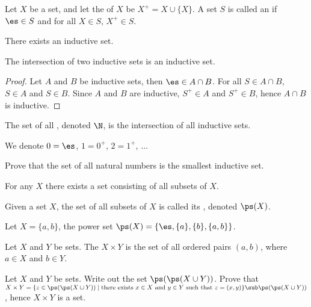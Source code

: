 \documentclass[10pt]{article}
\begin{document}
\begin{definition}
    Let $X$ be a set, and let the  of $X$ be ${X}^{+}=X\cup\{X\}$. A set $S$ is called an  if $\es\in S$ and for all $X\in S$, ${X}^{+}\in S$.
\end{definition}
\begin{Axiom of infinity}
    There exists an inductive set.
\end{Axiom of infinity}
\begin{proposition}
    The intersection of two inductive sets is an inductive set.
\end{proposition}
\begin{proof}
    Let $A$ and $B$ be inductive sets, then $\es\in A\cap B$. For all $S\in A\cap B$, $S\in A$ and $S\in B$. Since $A$ and $B$ are inductive, ${S}^{+}\in A$ and ${S}^{+}\in B$, hence $A\cap B$ is inductive.
\end{proof}
\par
\begin{definition}
    The set of all , denoted $\N$, is the intersection of all inductive sets. 
\end{definition}
\par
We denote $0=\es$, $1={0}^{+}$, $2={1}^{+}$, $\dots$
\begin{problem}
    Prove that the set of all natural numbers is the smallest inductive set.
\end{problem}
\begin{Axiom of power set}
    For any $X$ there exists a set consisting of all subsets of $X$.
\end{Axiom of power set}
\begin{definition}
    Given a set $X$, the set of all subsets of $X$ is called its , denoted $\ps(X)$.
\end{definition}
\begin{example}
    Let $X=\{a,b\}$, the power set $\ps(X)=\{\es,\{a\},\{b\},\{a,b\}\}$.
\end{example}
\begin{definition}
    Let $X$ and $Y$ be sets. The  $X\times Y$ is the set of all ordered pairs $(a,b)$, where $a\in X$ and $b\in Y$.
\end{definition}
\begin{problem}
    Let $X$ and $Y$ be sets. Write out the set $\ps(\ps(X\cup Y))$. Prove that $X\times Y=\{z\in\ps(\ps(X\cup Y))\mid\text{there exists}\ x\in X\ \text{and}\ y\in Y\ \text{such that}\ z=(x,y)\}\sub\ps(\ps(X\cup Y))$, hence $X\times Y$ is a set.
\end{problem}
\end{document}
